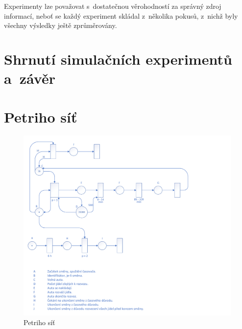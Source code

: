 \documentclass[a4paper, 11pt]{article}
\begin{document}
	Experimenty lze považovat s~dostatečnou věrohodností za správný zdroj
	informací, neboť se každý experiment skládal z~několika pokusů, z~nichž
	byly všechny výsledky ještě zprůměrovány.



	\section{Shrnutí simulačních experimentů a~závěr}



	\clearpage
	
	\renewcommand{\refname}{Literatura}
	



	\clearpage
	\appendix


	\section{Petriho síť}
	\label{appendix:petri_net}

	\begin{figure}[ht]
		\centering
		\includegraphics[width=1 \linewidth]{inc/petri_net.pdf}

		\caption{Petriho síť}
	\end{figure}
\end{document}

